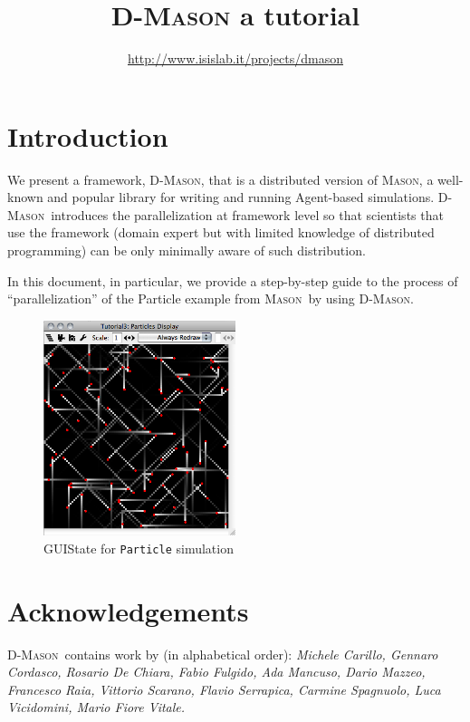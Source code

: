 \documentclass{article}
\def\ma{\textsc{Mason}}
\def\dm{\textsc{D-Mason}}
\begin{document}
\pagestyle{empty}
\sffamily
\title{\dm\: a tutorial}
\author{\url{http://www.isislab.it/projects/dmason}}
\maketitle



\section{Introduction}
We present a framework, \dm, that is a distributed version of  \ma, a well-known and popular library for writing and running Agent-based simulations. \dm\ introduces the parallelization at framework level so that scientists that use the framework (domain expert but with limited knowledge of distributed programming) can be only minimally aware of such distribution. 

In this document, in particular, we provide a step-by-step guide to the process of ``parallelization'' of the Particle example from \ma\ by using \dm.
\begin{figure}[ht]
	\centering
		\includegraphics[width=0.5\textwidth, bb=0 0 470 520]{particles.png}	
		\caption{GUIState for \texttt{Particle} simulation}
	\label{fig:p01}
\end{figure}

\section{Acknowledgements}
\dm\ contains work by (in alphabetical order): \textit{Michele Carillo, Gennaro Cordasco, Rosario De Chiara, Fabio Fulgido, Ada Mancuso, Dario Mazzeo, Francesco Raia, Vittorio Scarano, Flavio Serrapica, Carmine Spagnuolo, 
Luca Vicidomini, Mario Fiore Vitale.}
\end{document}
